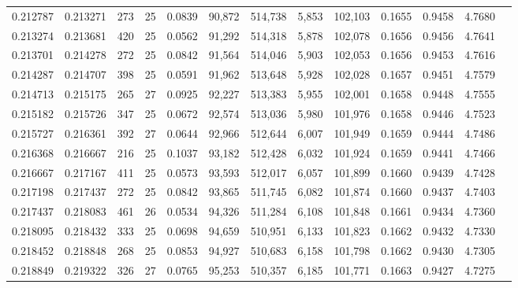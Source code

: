 \begin{tabular}{rrrrrrrrrrrrr}
0.212787 & 0.213271 &   273 &  25 &                                     0.0839 &  90,872 & 514,738 &   5,853 & 102,103 & 0.1655 & 0.9458 & 4.7680 \\
0.213274 & 0.213681 &   420 &  25 &                                     0.0562 &  91,292 & 514,318 &   5,878 & 102,078 & 0.1656 & 0.9456 & 4.7641 \\
0.213701 & 0.214278 &   272 &  25 &                                     0.0842 &  91,564 & 514,046 &   5,903 & 102,053 & 0.1656 & 0.9453 & 4.7616 \\
0.214287 & 0.214707 &   398 &  25 &                                     0.0591 &  91,962 & 513,648 &   5,928 & 102,028 & 0.1657 & 0.9451 & 4.7579 \\
0.214713 & 0.215175 &   265 &  27 &                                     0.0925 &  92,227 & 513,383 &   5,955 & 102,001 & 0.1658 & 0.9448 & 4.7555 \\
0.215182 & 0.215726 &   347 &  25 &                                     0.0672 &  92,574 & 513,036 &   5,980 & 101,976 & 0.1658 & 0.9446 & 4.7523 \\
0.215727 & 0.216361 &   392 &  27 &                                     0.0644 &  92,966 & 512,644 &   6,007 & 101,949 & 0.1659 & 0.9444 & 4.7486 \\
0.216368 & 0.216667 &   216 &  25 &                                     0.1037 &  93,182 & 512,428 &   6,032 & 101,924 & 0.1659 & 0.9441 & 4.7466 \\
0.216667 & 0.217167 &   411 &  25 &                                     0.0573 &  93,593 & 512,017 &   6,057 & 101,899 & 0.1660 & 0.9439 & 4.7428 \\
0.217198 & 0.217437 &   272 &  25 &                                     0.0842 &  93,865 & 511,745 &   6,082 & 101,874 & 0.1660 & 0.9437 & 4.7403 \\
0.217437 & 0.218083 &   461 &  26 &                                     0.0534 &  94,326 & 511,284 &   6,108 & 101,848 & 0.1661 & 0.9434 & 4.7360 \\
0.218095 & 0.218432 &   333 &  25 &                                     0.0698 &  94,659 & 510,951 &   6,133 & 101,823 & 0.1662 & 0.9432 & 4.7330 \\
0.218452 & 0.218848 &   268 &  25 &                                     0.0853 &  94,927 & 510,683 &   6,158 & 101,798 & 0.1662 & 0.9430 & 4.7305 \\
0.218849 & 0.219322 &   326 &  27 &                                     0.0765 &  95,253 & 510,357 &   6,185 & 101,771 & 0.1663 & 0.9427 & 4.7275 \\

\end{tabular}
